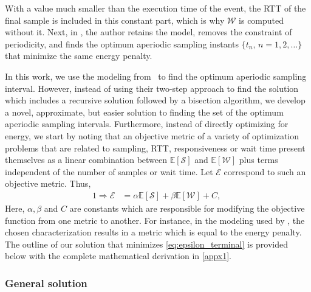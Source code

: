 With a value much smaller than the execution time of the event, the \ac{RTT} of the final sample is included in this constant part, which is why $\mathcal{W}$ is computed without it.
Next, in \textcite{secAperiodic}, the author retains the model, removes the constraint of periodicity, and finds the optimum aperiodic sampling instants $\{t_n,\,n=1,2,\dots\}$ that minimize the same energy penalty.

In this work, we use the modeling from~\cite{secAperiodic} to find the optimum aperiodic sampling interval.
However, instead of using their two-step approach to find the solution which includes a recursive solution followed by a bisection algorithm, we develop a novel, approximate, but easier solution to finding the set of the optimum aperiodic sampling intervals.
Furthermore, instead of directly optimizing for energy, we start by noting that an objective metric of a variety of optimization problems that are related to sampling, RTT, responsiveness or wait time present themselves 
as a linear combination between $\mathbb{E}[\mathcal{S}]$ and $\mathbb{E}[\mathcal{W}]$ plus terms independent of the number of samples or wait time.
Let $\mathcal{E}$ correspond to such an objective metric.
Thus,
\begin{alignat}{1}
    \Rightarrow\mathcal{E}&=\alpha\mathbb{E}[\mathcal{S}]+\beta\mathbb{E}[\mathcal{W}]+C,\;\label{eq:epsilon_terminal}
\end{alignat}
Here, $\alpha, \beta$ and $C$ are constants which are responsible for modifying the objective function from one metric to another.
For instance, in the modeling used by \textcite{ICCperiodic1,TMCperiodic,secAperiodic}, the chosen characterization results in a metric which is equal to the energy penalty.
The outline of our solution that minimizes \cref{eq:epsilon_terminal} is provided below with the complete mathematical derivation in \cref{appx1}.

\subsubsection{General solution}\label{sec:aprxSol}

